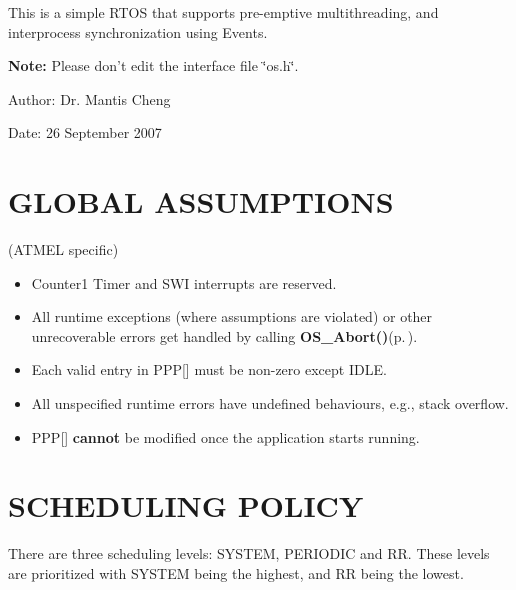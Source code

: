 This is a simple RTOS that supports pre-emptive multithreading, and interprocess synchronization using Events.

{\bf Note:} Please don't edit the interface file \char`\"{}os.h\char`\"{}.

\begin{Desc}
\item[Author:]Dr. Mantis Cheng \end{Desc}
\begin{Desc}
\item[Date:]26 September 2007\end{Desc}
\section{GLOBAL ASSUMPTIONS}\label{index_assumptions}
(ATMEL specific)\begin{itemize}
\item Counter1 Timer and SWI interrupts are reserved.\end{itemize}


\begin{itemize}
\item All runtime exceptions (where assumptions are violated) or other unrecoverable errors get handled by calling {\bf OS\_\-Abort()}{\rm (p.\,\pageref{os_8c_b5747390a8be675282cb93e5198bd085})}.\item Each valid entry in PPP[] must be non-zero except IDLE.\item All unspecified runtime errors have undefined behaviours, e.g., stack overflow.\item PPP[] {\bf cannot} be modified once the application starts running.\end{itemize}
\section{SCHEDULING POLICY}\label{index_policy}
There are three scheduling levels: SYSTEM, PERIODIC and RR. These levels are prioritized with SYSTEM being the highest, and RR being the lowest.


